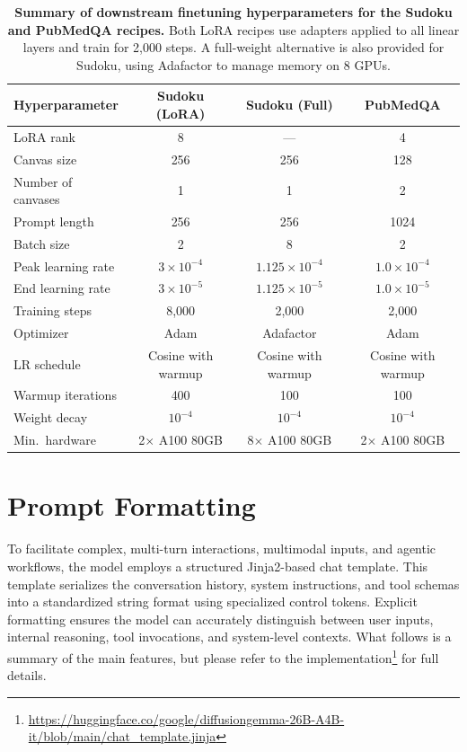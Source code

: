 \documentclass[11pt, a4paper, logo, copyright, gdm]{google}
\begin{document}
\begin{table}[h]
\centering
\small
\begin{tabular}{lccc}
\toprule
\textbf{Hyperparameter} & \textbf{Sudoku (LoRA)} & \textbf{Sudoku (Full)} & \textbf{PubMedQA} \\
\midrule
LoRA rank & 8 & --- & 4 \\
Canvas size & 256 & 256 & 128 \\
Number of canvases & 1 & 1 & 2 \\
Prompt length & 256 & 256 & 1024 \\
Batch size & 2 & 8 & 2 \\
Peak learning rate & $3 \times 10^{-4}$ & $1.125\times 10^{-4}$ & $1.0 \times 10^{-4}$ \\
End learning rate & $3 \times 10^{-5}$ & $1.125\times 10^{-5}$ & $1.0 \times 10^{-5}$ \\
Training steps & 8{,}000 & 2{,}000 & 2{,}000 \\
Optimizer & Adam & Adafactor & Adam \\
LR schedule & Cosine with warmup & Cosine with warmup & Cosine with warmup \\
Warmup iterations & 400 & 100 & 100 \\
Weight decay & $10^{-4}$ & $10^{-4}$ & $10^{-4}$ \\
Min.\ hardware & 2$\times$ A100 80GB & 8$\times$ A100 80GB & 2$\times$ A100 80GB \\
\bottomrule
\end{tabular}
\caption{\textbf{Summary of downstream finetuning hyperparameters for the Sudoku and PubMedQA recipes.} Both LoRA recipes use adapters applied to all linear layers and train for 2{,}000 steps. A full-weight alternative is also provided for Sudoku, using Adafactor to manage memory on 8 GPUs.}
\label{tab:sft_recipes}
\end{table}







\section{Prompt Formatting} \label{sec:prompt_formatting}

To facilitate complex, multi-turn interactions, multimodal inputs, and agentic workflows, the model employs a structured Jinja2-based chat template. This template serializes the conversation history, system instructions, and tool schemas into a standardized string format using specialized control tokens. Explicit formatting ensures the model can accurately distinguish between user inputs, internal reasoning, tool invocations, and system-level contexts. What follows is a summary of the main features, but please refer to the implementation\footnote{\url{https://huggingface.co/google/diffusiongemma-26B-A4B-it/blob/main/chat_template.jinja}} for full details.
\end{document}
